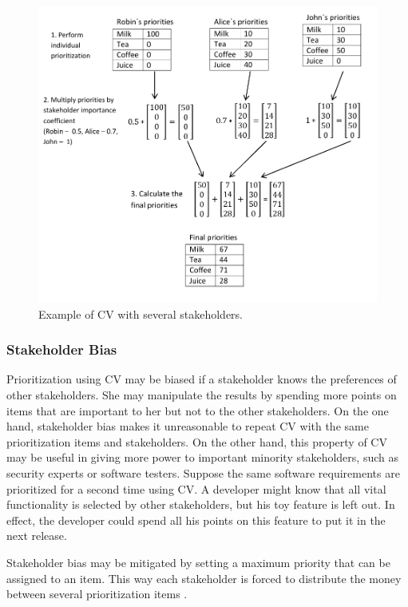\begin{figure}
	\center
\includegraphics[scale=0.55]{fig/cv}
\caption{\label{fig:Example-of-Cumulative}Example of CV with several stakeholders.}
\end{figure}

\subsubsection{Stakeholder Bias\label{sub:Stakeholder-Bias}}

Prioritization using CV may be biased if a stakeholder knows the preferences
of other stakeholders. She may manipulate the results by spending more
points on items that are important to her but not to the other stakeholders.
On the one hand, stakeholder bias makes it unreasonable to repeat CV
with the same prioritization items and stakeholders. On the other hand,
this property of CV may be useful in giving more power to important
minority stakeholders, such as security experts or software testers.
Suppose the same software requirements are prioritized for a second time using
CV. A developer might know that all vital functionality is selected by
other stakeholders, but his toy feature is left out. In effect, the developer
could spend all his points on this feature to put it in the next release. 

Stakeholder bias may be mitigated by setting a maximum priority that
can be assigned to an item. This way each stakeholder is forced to
distribute the money between several prioritization items \cite{Berander2006a}.

